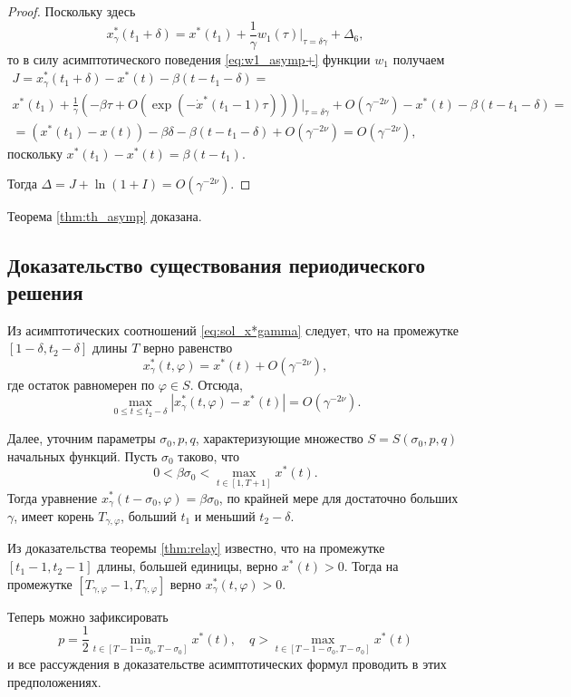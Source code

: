 \begin{proof}
Поскольку здесь
\[
x_\gamma^*(t_1+\delta) = x^*(t_1) + \frac{1}{\gamma} w_1(\tau)\bigg\vert_{\tau=\delta\gamma} + \Delta_6,
\]
то в силу асимптотического поведения \eqref{eq:w1_asymp+} функции $w_1$ получаем
\begin{multline*}
	J = x_\gamma^*(t_1 + \delta) - x^*(t) - \beta(t - t_1 - \delta) =\\
	x^*(t_1) + \frac{1}{\gamma} (-\beta\tau + O(\exp(-\dot{x}^*(t_1 - 1) \tau)))\bigg\vert_{\tau = \delta\gamma} + O(\gamma^{-2\nu}) - x^*(t) - \beta(t - t_1 - \delta) =\\
	= (x^*(t_1) - x(t)) - \beta \delta - \beta(t - t_1 - \delta) + O(\gamma^{-2\nu}) = O(\gamma^{-2\nu}),
\end{multline*}
поскольку $x^*(t_1) - x^*(t) = \beta (t - t_1)$.

Тогда $\Delta = J + \ln(1 + I) = O(\gamma^{-2\nu})$.
	
\end{proof}

Теорема \ref{thm:th_asymp} доказана.

\subsection{Доказательство существования периодического решения}

Из асимптотических соотношений \eqref{eq:sol_x*gamma} следует, что на промежутке\\$[1 - \delta, t_2 - \delta]$ длины $T$ верно равенство
\[
x_\gamma^*(t, \varphi) = x^*(t) + O(\gamma^{-2\nu}),
\]
где остаток равномерен по $\varphi \in S$.
Отсюда,
\[
\max\limits_{0 \leqslant t \leqslant t_2 - \delta}|x_\gamma^*(t, \varphi) - x^*(t)| = O(\gamma^{-2\nu}).
\]

Далее, уточним параметры $\sigma_0, p, q$, характеризующие множество $S = S(\sigma_0, p, q)$ начальных функций. Пусть $\sigma_0$ таково, что
%
\[
0 < \beta \sigma_0 < \max\limits_{t \in [1, T + 1]} x^*(t).
\]
%
Тогда уравнение $x^*_\gamma(t - \sigma_0, \varphi) = \beta \sigma_0$, по крайней мере для достаточно больших $\gamma$, имеет корень $T_{\gamma, \varphi}$, больший $t_1$ и меньший $t_2 - \delta$.

Из доказательства теоремы \ref{thm:relay} известно, что на промежутке $[t_1 - 1, t_2 - 1]$ длины, большей единицы, верно $x^*(t) > 0$. Тогда на промежутке $[T_{\gamma, \varphi} - 1, T_{\gamma, \varphi}]$ верно $x^*_{\gamma}(t, \varphi) > 0$.

Теперь можно зафиксировать
\[
p = \frac{1}{2}\min\limits_{t \in [T - 1 - \sigma_0, T - \sigma_0]} x^*(t), \quad q > \max\limits_{t \in [T - 1 - \sigma_0, T - \sigma_0]} x^*(t)
\]
и все рассуждения в доказательстве асимптотических формул проводить в этих предположениях.

